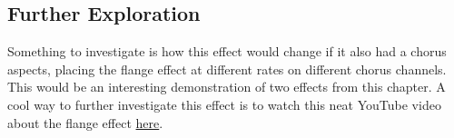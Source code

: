 \subsection{Further Exploration}
Something to investigate is how this effect would change if it also had a chorus aspects, placing the flange effect at different rates on different chorus channels. This would be an interesting demonstration of two effects from this chapter. A cool way to further investigate this effect is to watch this neat YouTube video about the flange effect \href{https://www.youtube.com/watch?v=Ici_YOVDl_0}{here}.
